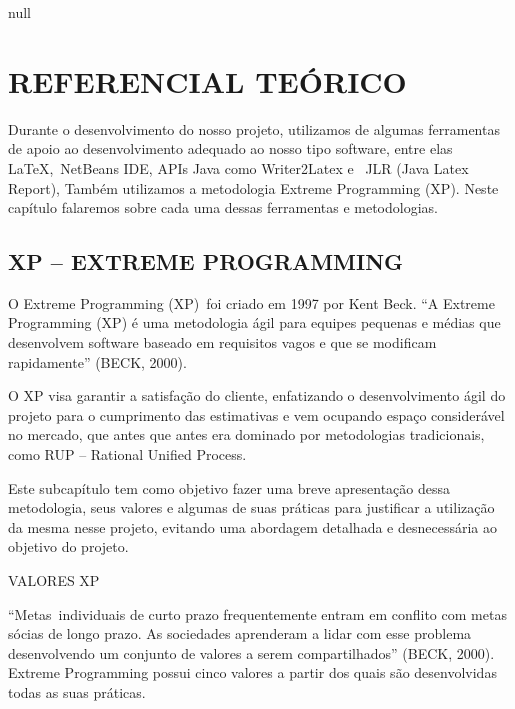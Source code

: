 null
\chapter[REFERENCIAL TE\'ORICO]{ REFERENCIAL TE\'ORICO}

\bigskip

{
Durante o desenvolvimento do nosso projeto, utilizamos de algumas ferramentas de apoio ao desenvolvimento adequado ao
nosso tipo software, entre elas {\LaTeX},\ NetBeans IDE, APIs Java como Writer2Latex e \ JLR (Java Latex Report),
Tamb\'em utilizamos a metodologia Extreme Programming (XP). Neste cap\'itulo falaremos sobre cada uma dessas
ferramentas e metodologias.}


\bigskip

\section[XP {}-- EXTREME PROGRAMMING]{ XP -- EXTREME PROGRAMMING}

\bigskip

{
O Extreme Programming (XP)\ foi criado em 1997 por Kent Beck. ``A Extreme Programming (XP) \'e uma metodologia \'agil
para equipes pequenas e m\'edias que desenvolvem software baseado em requisitos vagos e que se modificam rapidamente''
(BECK, 2000).}

{
O XP visa garantir a satisfa\c{c}\~ao do cliente, enfatizando o desenvolvimento \'agil do projeto para o cumprimento das
estimativas e vem ocupando espa\c{c}o consider\'avel no mercado, que antes que antes era dominado por metodologias
tradicionais, como RUP -- Rational Unified Process.}

{
Este subcap\'itulo tem como objetivo fazer uma breve apresenta\c{c}\~ao dessa metodologia, seus valores e algumas de
suas pr\'aticas para justificar a utiliza\c{c}\~ao da mesma nesse projeto, evitando uma abordagem detalhada e
desnecess\'aria ao objetivo do projeto.}


\bigskip

{
VALORES XP}


\bigskip

{
{}``Metas\ individuais de curto prazo frequentemente entram em conflito com metas s\'ocias de longo prazo. As sociedades
aprenderam a lidar com esse problema desenvolvendo um conjunto de valores a serem compartilhados'' (BECK, 2000).
Extreme Programming possui cinco valores a partir dos quais s\~ao desenvolvidas todas as suas pr\'aticas.}


\bigskip

